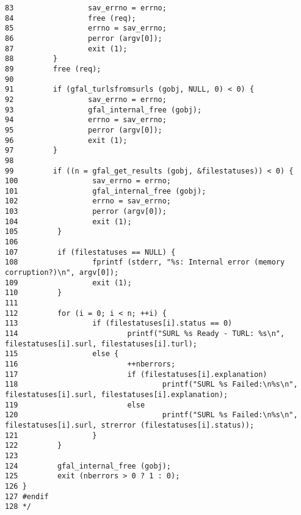 \begin{DocInclude}
\begin{verbatim}
83                 sav_errno = errno;
84                 free (req);
85                 errno = sav_errno;
86                 perror (argv[0]);
87                 exit (1);
88         }
89         free (req);
90 
91         if (gfal_turlsfromsurls (gobj, NULL, 0) < 0) {
92                 sav_errno = errno;
93                 gfal_internal_free (gobj);
94                 errno = sav_errno;
95                 perror (argv[0]);
96                 exit (1);
97         }
98 
99         if ((n = gfal_get_results (gobj, &filestatuses)) < 0) {
100                 sav_errno = errno;
101                 gfal_internal_free (gobj);
102                 errno = sav_errno;
103                 perror (argv[0]);
104                 exit (1);
105         }
106 
107         if (filestatuses == NULL) {
108                 fprintf (stderr, "%s: Internal error (memory corruption?)\n", argv[0]);
109                 exit (1);
110         }
111 
112         for (i = 0; i < n; ++i) {
113                 if (filestatuses[i].status == 0)
114                         printf("SURL %s Ready - TURL: %s\n", filestatuses[i].surl, filestatuses[i].turl);
115                 else {
116                         ++nberrors;
117                         if (filestatuses[i].explanation)
118                                 printf("SURL %s Failed:\n%s\n", filestatuses[i].surl, filestatuses[i].explanation);
119                         else
120                                 printf("SURL %s Failed:\n%s\n", filestatuses[i].surl, strerror (filestatuses[i].status));
121                 }
122         }
123 
124         gfal_internal_free (gobj);
125         exit (nberrors > 0 ? 1 : 0);
126 }
127 #endif
128 */
\end{verbatim}
\end{DocInclude}
 